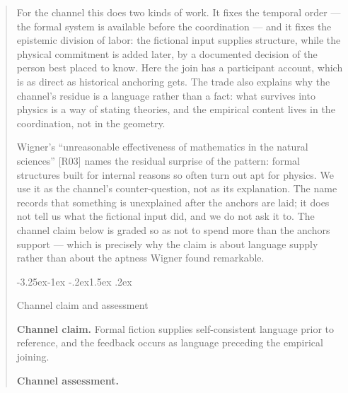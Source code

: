 \documentclass[11pt,a4paper]{article}
\makeatletter
\renewcommand\subsection{\@startsection{subsection}{2}{\z@}%
  {-3.25ex\@plus -1ex \@minus -.2ex}{1.5ex \@plus .2ex}%
  {\normalfont\large\bfseries\raggedright}}
\makeatother
\begin{document}
\begin{abstract}
For the channel this does two kinds of work. It fixes the temporal order — the formal system is available before the coordination — and it fixes the epistemic division of labor: the fictional input supplies structure, while the physical commitment is added later, by a documented decision of the person best placed to know. Here the join has a participant account, which is as direct as historical anchoring gets. The trade also explains why the channel's residue is a language rather than a fact: what survives into physics is a way of stating theories, and the empirical content lives in the coordination, not in the geometry.

Wigner's ``unreasonable effectiveness of mathematics in the natural sciences'' [R03] names the residual surprise of the pattern: formal structures built for internal reasons so often turn out apt for physics. We use it as the channel's counter-question, not as its explanation. The name records that something is unexplained after the anchors are laid; it does not tell us what the fictional input did, and we do not ask it to. The channel claim below is graded so as not to spend more than the anchors support — which is precisely why the claim is about language supply rather than about the aptness Wigner found remarkable.

\subsection{Channel claim and assessment}

\textbf{Channel claim.} Formal fiction supplies self-consistent language prior to reference, and the feedback occurs as language preceding the empirical joining.

\textbf{Channel assessment.}


\end{abstract}
\end{document}
